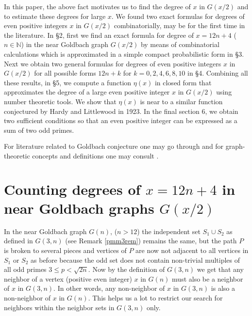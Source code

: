 \documentclass[11pt]{article}
\theoremstyle{definition}
\theoremstyle{remark}
\numberwithin{equation}{section}
\newcommand{\Nat}{\mathbb{N}}
\begin{document}
\vspace{1em}
\noindent
In this paper, the above fact motivates us to find the degree of $x$ in $G(x/2)$ and to estimate these degrees for large $x$. We found two exact formulas for degrees of even positive integers $x$ in $G(x/2)$ combinatorially, may be for the first time in the literature. In \S 2, first we find an exact formula for degree of $x=12n+4$ ($n\in\Nat$) in the near Goldbach graph $G(x/2)$ by means of combinatorial calculations which is approximated in a simple compact probabilistic form in \S 3. Next we obtain two general formulas for degrees of even positive integers $x$ in $G(x/2)$ for all possible forms $12n+k$ for $k=0,2,4,6,8,10$ in \S 4. Combining all these results, in \S 5, we compute a function $\eta(x)$ in closed form that approximates the degree of a large even positive integer $x$ in $G(x/2)$ using number theoretic tools. We show that $\eta(x)$ is near to a similar function conjectured by Hardy and Littlewood in 1923. In the final section 6, we obtain two sufficient conditions so that an even positive integer can be expressed as a sum of two odd primes. 

\vspace{1em}
\noindent
For literature related to Goldbach conjecture one may go through \cite{chen,HL,RICH,TAO,VIN} and for graph-theoretic concepts and definitions one may consult \cite{DBW}.

\section{Counting degrees of $x=12n+4$ in near Goldbach graphs $G(x/2)$}\label{sec12n4}

In the near Goldbach graph $G(n)$, ($n>12$) the independent set $S_1\cup S_2$ as defined in $G(3,n)$ (see Remark \ref{pmm3rem}) remains the same, but the path $P$ is broken to several pieces and vertices of $P$ are now not adjacent to all vertices in  $S_1$ or $S_2$ as before because the odd set does not contain non-trivial multiples of all odd primes $3\leq p<\sqrt{2n}$. Now by the definition of $G(3,n)$ we get that any neighbor of a vertex (positive even integer) $x$ in $G(n)$ must also be a neighbor of $x$ in $G(3,n)$. In other words, any non-neighbor of $x$ in $G(3,n)$ is also a non-neighbor of $x$ in $G(n)$. This helps us a lot to restrict our search for neighbors within the neighbor sets in $G(3,n)$ only.
\end{document}
